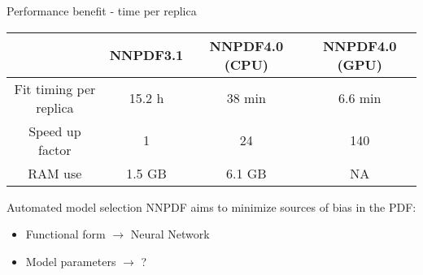 \begin{frame}{Performance benefit - time per replica}
  \begin{table}
     \renewcommand{\arraystretch}{1.50}
    \centering
    \begin{tabular}{c | c | c | c} \toprule
      & NNPDF3.1  & NNPDF4.0 (CPU) & NNPDF4.0  (GPU) \\
            \midrule
      Fit timing per replica    & 15.2 h        & 38 min        & 6.6 min \\ \hline
             Speed up factor    & 1        &  24      & 140 \\ \hline
      RAM use &  1.5 GB          &  6.1 GB                 & NA  \\ \bottomrule
    \end{tabular}
  \end{table}
  \vspace*{1em}
\end{frame}


\begin{frame}[t]{Automated model selection}
	NNPDF aims to minimize sources of bias in the PDF:
	\begin{itemize}
	    \item Functional form $\rightarrow$ Neural Network
	    \item Model parameters $\rightarrow$ ?
	\end{itemize}
\end{frame}


